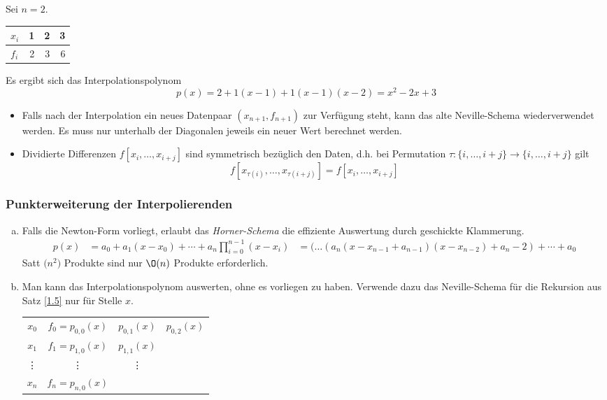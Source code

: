 \documentclass[a4paper,11pt]{scrartcl}
\begin{document}
\begin{ex*}
	Sei $n=2$.	
	\begin{tabular}{l|rrr}
		$x_i$ & 1 & 2 & 3  \\ \hline
		$f_i$ & 2 & 3 & 6 
	\end{tabular}
	
	Es ergibt sich das Interpolationspolynom
	\[
		p(x) = 2+ 1(x-1) + 1(x-1)(x-2) = x^2 -2x+3
	\]
\end{ex*}

\begin{note}
	\begin{itemize}
		\item Falls nach der Interpolation ein neues Datenpaar $(x_{n+1},f_{n+1})$ zur Verfügung steht, kann das alte Neville-Schema wiederverwendet werden.
			Es muss nur unterhalb der Diagonalen jeweils ein neuer Wert berechnet werden.
		\item
			Dividierte Differenzen $f[x_i,\dotsc,x_{i+j}]$ sind symmetrisch bezüglich den Daten, d.h. bei Permutation $\tau: \{i,\dotsc,i+j\} \to \{i,\dotsc,i+j\}$ gilt
			\[
				f[x_{\tau(i)},\dotsc,x_{\tau(i+j)}] = f[x_i,\dotsc,x_{i+j}]
			\]
	\end{itemize}
\end{note}

\subsubsection{Punkterweiterung der Interpolierenden}

\begin{enumerate}[a)]
	\item 
		Falls die Newton-Form vorliegt, erlaubt das \emph{Horner-Schema} die effiziente Auswertung durch geschickte Klammerung.
		\begin{align*}
			p(x) &= a_0 + a_1(x-x_0) + \dotsb + a_n\prod_{i=0}^{n-1}(x-x_i)
				&= (\dotso(a_n(x-x_{n-1} + a_{n-1})(x-x_{n-2}) + a_n-2) + \dotsb + a_0
		\end{align*}
		Satt $\mathcal(n^2)$ Produkte sind nur  $\O(n)$ Produkte erforderlich.
	\item
		Man kann das Interpolationspolynom auswerten, ohne es vorliegen zu haben.
		Verwende dazu das Neville-Schema für die Rekursion aus Satz \ref{1.5} nur für Stelle $x$.
		\begin{tabular}{cccc}
		$x_0$ & $f_0=p_{0,0}(x)$ & $p_{0,1}(x)$ & $p_{0,2}(x)$ \\
		$x_1$ & $f_1=p_{1,0}(x)$ & $p_{1,1}(x)$ &  \\
		\vdots & \vdots & \vdots\\
		$x_n$ & $f_n=p_{n,0}(x)$ &\\
		\end{tabular}
\end{enumerate}
\end{document}
